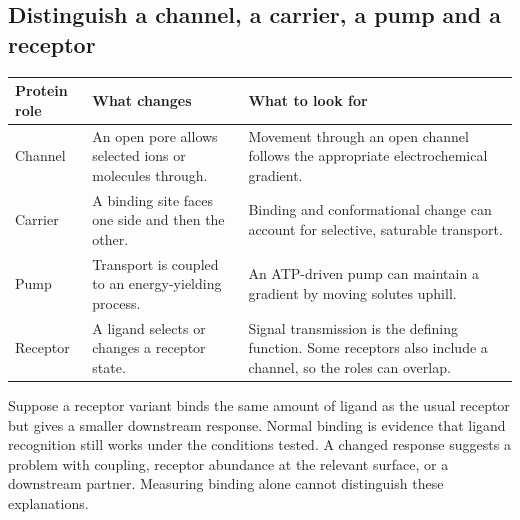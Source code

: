 \documentclass[12pt,a4paper]{article}
\begin{document}
\subsection{Distinguish a channel, a carrier, a pump and a receptor}
\par\vspace{6pt}
\noindent\begin{tabularx}{\linewidth}{|B{3.2cm}|Y|Y|}
\hline
\textbf{Protein role} & \textbf{What changes} & \textbf{What to look for} \\ \hline
Channel & An open pore allows selected ions or molecules through. & Movement through an open channel follows the appropriate electrochemical gradient. \\ \hline
Carrier & A binding site faces one side and then the other. & Binding and conformational change can account for selective, saturable transport. \\ \hline
Pump & Transport is coupled to an energy-yielding process. & An ATP-driven pump can maintain a gradient by moving solutes uphill. \\ \hline
Receptor & A ligand selects or changes a receptor state. & Signal transmission is the defining function. Some receptors also include a channel, so the roles can overlap. \\ \hline
\end{tabularx}\par

\begin{tcolorbox}[examplebox, title={Distinguish binding from signalling}]
Suppose a receptor variant binds the same amount of ligand as the usual receptor but gives a smaller downstream response. Normal binding is evidence that ligand recognition still works under the conditions tested. A changed response suggests a problem with coupling, receptor abundance at the relevant surface, or a downstream partner. Measuring binding alone cannot distinguish these explanations.
\end{tcolorbox}
\end{document}
